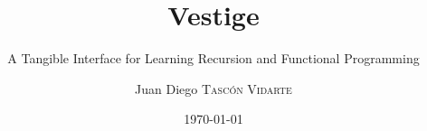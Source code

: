 \documentclass{beamer}
\title{Vestige}
\subtitle{A Tangible Interface for Learning Recursion and Functional Programming}
\author{Juan Diego \textsc{Tascón Vidarte}}
\institute{Konkuk University \\ HCI Lab}
\date{\today{}}
\begin{document}
\begin{frame}
  \titlepage
\end{frame}

\begin{frame}{}
  \tableofcontents
\end{frame}





\nocite{*}
\end{document}
